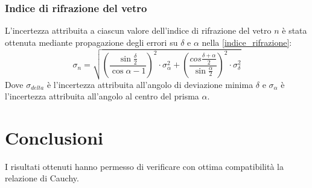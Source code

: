 \documentclass[]{article}
\let\oldsection\section%
\renewcommand{\section}{%
	\renewcommand{\theequation}{\thesection.\arabic{equation}}%
	\oldsection}%
\begin{document}
    \subsubsection{Indice di rifrazione del vetro}
    L'incertezza attribuita a ciascun valore dell'indice di rifrazione del vetro $n$ è stata ottenuta mediante propagazione degli errori su $\delta$ e $\alpha$ nella \ref{indice_rifrazione}:
    \begin{equation}
        \label{sigma-n}
        \sigma_n = \sqrt{ \left(\frac{\sin{\frac{\delta}{2}}}{\cos{\alpha}-1}\right)^2 \cdot \sigma_{\alpha}^2 + \left(\frac{cos{\frac{\delta + \alpha}{2}}}{\sin{\frac{\alpha}{2}}}\right)^2 \cdot \sigma_{\delta}^2   }
    \end{equation}
    Dove $\sigma_{delta}$ è l'incertezza attribuita all'angolo di deviazione minima $\delta$ e $\sigma_{\alpha}$ è l'incertezza attribuita all'angolo al centro del prisma $\alpha$.

    \section{Conclusioni}
    I risultati ottenuti hanno permesso di verificare con ottima compatibilità la relazione di Cauchy.
\end{document}
